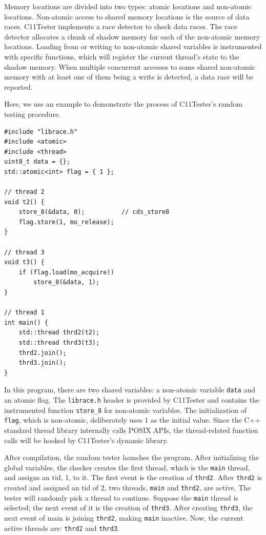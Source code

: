 Memory locations are divided into two types: atomic locations and non-atomic locations. Non-atomic access to shared memory locations is the source of data races. C11Tester implements a race detector to check data races. The race detector allocates a chunk of shadow memory for each of the non-atomic memory locations. Loading from or writing to non-atomic shared variables is instrumented with specific functions, which will register the current thread's state to the shadow memory. When multiple concurrent accesses to some shared non-atomic memory with at least one of them being a write is detected, a data race will be reported.

Here, we use an example to demonstrate the process of C11Tester's random testing procedure.

\begin{lstlisting}[caption={P3}, label={P3}]
#include "librace.h"
#include <atomic>
#include <thread>
uint8_t data = {};
std::atomic<int> flag = { 1 };  

// thread 2
void t2() {
    store_8(&data, 0);          // cds_store8    
    flag.store(1, mo_release); 
}

// thread 3
void t3() {
    if (flag.load(mo_acquire))
        store_8(&data, 1);
}

// thread 1
int main() {
    std::thread thrd2(t2);
    std::thread thrd3(t3);
    thrd2.join();
    thrd3.join();
}
\end{lstlisting}

In this program, there are two shared variables: a non-atomic variable \texttt{data} and an atomic flag. The \texttt{librace.h} header is provided by C11Tester and contains the instrumented function \texttt{store\_8} for non-atomic variables. The initialization of \texttt{flag}, which is non-atomic, deliberately uses 1 as the initial value. Since the C++ standard thread library internally calls POSIX APIs, the thread-related function calls will be hooked by C11Tester's dynamic library.

After compilation, the random tester launches the program. After initializing the global variables, the checker creates the first thread, which is the \texttt{main} thread, and assigns an tid, 1, to it. The first event is the creation of \texttt{thrd2}. After \texttt{thrd2} is created and assigned an tid of 2, two threads, \texttt{main} and \texttt{thrd2}, are active. The tester will randomly pick a thread to continue. Suppose the \texttt{main} thread is selected; the next event of it is the creation of \texttt{thrd3}. After creating \texttt{thrd3}, the next event of main is joining \texttt{thrd2}, making \texttt{main} inactive. Now, the current active threads are: \texttt{thrd2} and \texttt{thrd3}.

